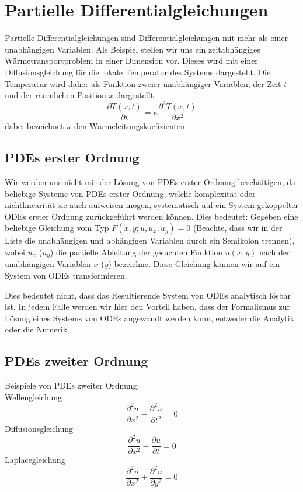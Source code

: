 \chapter{Partielle Differentialgleichungen}
Partielle Differentialgleichungen sind Differentialgleichungen mit mehr als
einer unabhängigen Variablen.  Als Beispiel stellen wir uns ein zeitabhängiges
Wärmetransportproblem in einer Dimension vor. Dieses wird mit einer
Diffusionsgleichung für die lokale Temperatur des Systems dargestellt. Die
Temperatur wird daher als Funktion zweier unabhängiger Variablen, der Zeit $t$
und der räumlichen Position $x$ dargestellt
\[\frac{\partial T(x,t)}{\partial t}=\kappa\frac{\partial^2 T(x,t)}{\partial x^2}\]
dabei bezeichnet $\kappa$ den Wärmeleitungskoefizienten.
\section{PDEs erster Ordnung}

Wir werden uns nicht mit der Lösung von PDEs erster Ordnung beschäftigen,
da beliebige Systeme von PDEs erster Ordnung, welche komplexität oder
nichtlinearität sie auch aufweisen mögen, systematisch auf ein System
gekoppelter ODEs erster Ordnung zurückgeführt werden können.
Dies bedeutet: Gegeben eine beliebige Gleichung vom Typ $F(x,y;u,u_x,u_y)=0$
(Beachte, dass wir in der Liste die unabhängigen und abhängigen Variablen
durch ein Semikolon trennen), wobei $u_x$ ($u_y$) die partielle Ableitung der
gesuchten Funktion $u(x,y)$ nach der unabhängigen Variablen $x$ ($y$)
bezeichne. Diese Gleichung können wir auf ein System von ODEs transformieren.

Dies bedeutet nicht, dass das Resultierende System von ODEs analytisch lösbar
ist. In jedem Falle werden wir hier den Vorteil haben, dass der Formalismus zur
Lösung eines Systems von ODEs angewandt werden kann, entweder die Analytik
oder die Numerik.
\section{PDEs zweiter Ordnung}
Beispiele von PDEs zweiter Ordnung:\\
Wellengleichung
\begin{equation}
	\frac{\partial^2 u}{\partial x^2}-\frac{\partial^2 u}{\partial t^2}=0
\end{equation}
Diffusionsgleichung
\begin{equation}
	\frac{\partial^2 u}{\partial x^2}-\frac{\partial u}{\partial t}=0
\end{equation}
Laplacegleichung
\begin{equation}
	\frac{\partial^2 u}{\partial x^2}+\frac{\partial^2 u}{\partial y^2}=0
\end{equation}

